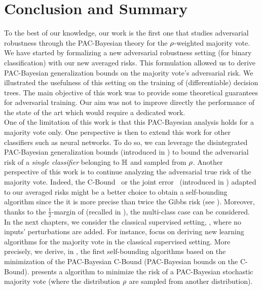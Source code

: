 \section{Conclusion and Summary}
\label{chap:mv-robustness:section:conclusion}

To the best of our knowledge, our work is the first one that studies adversarial robustness through the PAC-Bayesian theory for the $\rho$-weighted majority vote. 
We have started by formalizing a new adversarial robustness setting (for binary classification) with our new averaged risks.
This formulation allowed us to derive PAC-Bayesian generalization bounds on the majority vote's adversarial risk.
We illustrated the usefulness of this setting on the training of (differentiable) decision trees.
The main objective of this work was to provide some theoretical guarantees for adversarial training. 
Our aim was not to improve directly the performance of the state of the art which would require a dedicated work.\\

One of the limitation of this work is that this PAC-Bayesian analysis holds for a majority vote only.
One perspective is then to extend this work for other classifiers such as neural networks.
To do so, we can leverage the disintegrated PAC-Bayesian generalization bounds (introduced in ) to bound the adversarial risk of a {\it single classifier} belonging to $\mathbb{H}$ and sampled from $\rho$.
Another perspective of this work is to continue analyzing the adversarial true risk of the majority vote.
Indeed, the C-Bound~\citep{LacasseLavioletteMarchandGermainUsunier2006} or the joint error~\citep{MasegosaLorenzenIgelSeldin2020} (introduced in ) adapted to our averaged risks might be a better choice to obtain a self-bounding algorithm since the it is more precise than twice the Gibbs risk (see ).
Moreover, thanks to the $\frac{1}{2}$-margin of \citet{LavioletteMorvantRalaivolaRoy2017} (recalled in ), the multi-class case can be considered.\\

In the next chapters, we consider the classical supervised setting, \ie, where no inputs' perturbations are added.
For instance,  focus on deriving new learning algorithms for the majority vote in the classical supervised setting.
More precisely, we derive, in , the first self-bounding algorithms based on the minimization of the PAC-Bayesian C-Bound (\ie PAC-Bayesian bounds on the C-Bound).
 presents a algorithm to minimize the risk of a PAC-Bayesian stochastic majority vote (where the distribution $\rho$ are sampled from another distribution).